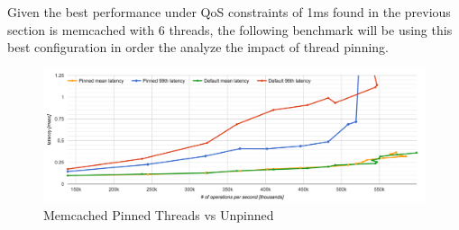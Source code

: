 Given the best performance under QoS constraints of 1ms found in the previous section is memcached with 6 threads, the following benchmark will be using this best configuration in order the analyze the impact of thread pinning.

\begin{figure}[h]
    \includegraphics[width=\textwidth]{./res/5_threads_pinned_vs_default.png}
    \caption{Memcached Pinned Threads vs Unpinned}
    \label{fig:memcached-threads-pinned-vs-default}
\end{figure}


